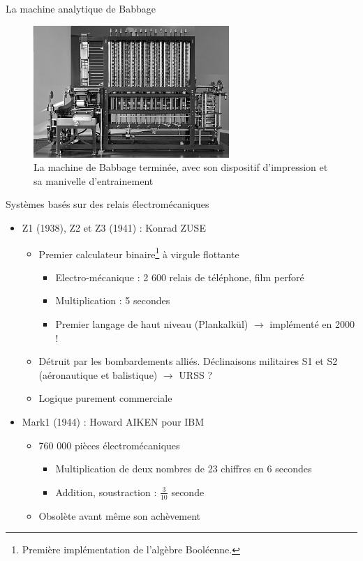 \begin{frame}{La machine analytique de Babbage}
\begin{figure}
\includegraphics[height=5cm]{../illustration/babbage_engine.jpg}
\caption{La machine de Babbage terminée, avec son dispositif d'impression et sa manivelle d'entrainement}
\end{figure}
\end{frame}


\begin{frame}{Systèmes basés sur des relais électromécaniques}
\begin{itemize}
\item<1> Z1 (1938), Z2 et Z3 (1941) : Konrad ZUSE \cite{wp-zuse}
\begin{itemize}
\item Premier calculateur binaire\footnote{Première implémentation de l'algèbre Booléenne.} à virgule flottante
\begin{itemize}
\item Electro-mécanique : 2 600 relais de téléphone, film perforé
\item Multiplication : 5 secondes
\item Premier langage de haut niveau (Plankalkül) $\rightarrow$ implémenté en 2000 !
\end{itemize}
\item Détruit par les bombardements alliés. Déclinaisons militaires S1 et S2 (aéronautique et balistique) $\rightarrow$ URSS ?
\item Logique purement commerciale
\end{itemize}
\item<2> Mark1 (1944) : Howard AIKEN pour IBM
\begin{itemize}
\item 760 000 pièces électromécaniques
\begin{itemize}
\item Multiplication de deux nombres de 23 chiffres en 6 secondes
\item Addition, soustraction : $\frac{3}{10}$ seconde
\end{itemize}
\item Obsolète avant même son achèvement
\end{itemize}
\end{itemize}
\end{frame}

